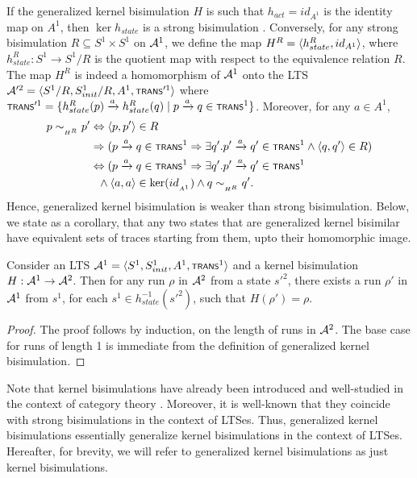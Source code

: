 If the generalized kernel bisimulation $H$ is such that $h_{act} = id_{A^1}$ is the identity map on $A^1$, then $\ker{h_{state}}$ is a strong bisimulation \cite[Appendix B]{tech-rpt}. Conversely, for any strong bisimulation  $R \subseteq S^1 \times S^1$ on $\cal A^1$, we define the map $H^{R} = \tup{h_{state}^{R},id_{A^1}}$, where $h_{state}^{R} : S^1 \rightarrow S^1/R$ is the quotient map with respect to the equivalence relation $R$. The map $H^R$ is indeed a homomorphism of $\cal A^1$ onto the LTS $\cal A'^2 = \tup{S^1/R,S_{init}^1/R,A^1,\trans'^1}$ where $\trans'^1 = \{ h_{state}^{R}(p) \xrightarrow{a} h_{state}^{R}(q) \mid p \xrightarrow{a} q \in \trans^1 \}$. Moreover, for any $a \in A^1$,
\begin{align*}
	p\sim\subsub{H^R} p' & \Leftrightarrow \tup{p,p'} \in R\\
	& \Rightarrow (p \xrightarrow{a} q \in \trans^1 \Rightarrow \exists q'. p' \xrightarrow{a} q' \in \trans^1 \wedge \tup{q,q'}\in R)\\
	& \Leftrightarrow (p \xrightarrow{a} q \in \trans^1 \Rightarrow \exists q'. p' \xrightarrow{a} q' \in \trans^1\\
	&  \,\,\,\,\wedge \tup{a,a}\in \ker{id\subsub{A^1}} \wedge q\sim\subsub{H^R}q'.
\end{align*}
Hence, generalized kernel bisimulation is weaker than strong bisimulation. Below, we state as a corollary, that any two states that are generalized kernel bisimilar have equivalent sets of traces starting from them, upto their homomorphic image.

\begin{lemma}\label{lem:bisim}
	Consider an LTS $\cal A^1 = \tup{S^1,S^1_{init},A^1,\trans^1}$ and a kernel bisimulation $H : \cal A^1 \rightarrow \cal A^2$. Then for any run $\rho$ in $\cal A^2$ from a state $s'^2$, there exists a run $\rho'$ in $\cal A^1$ from $s^1$, for each $s^1 \in h_{state}^{-1}(s'^2)$, such that $H(\rho') = \rho$.
\end{lemma}
\begin{proof}
	The proof follows by induction, on the length of runs in $\cal A^2$. The base case for runs of length 1 is immediate from the definition of generalized kernel bisimulation.
\end{proof}

Note that kernel bisimulations have already been introduced and well-studied in the context of category theory \cite{goncharov2014coalgebraic,staton2011relating}. Moreover, it is well-known that they coincide with strong bisimulations in the context of LTSes. Thus, generalized kernel bisimulations essentially generalize kernel bisimulations in the context of LTSes. Hereafter, for brevity, we will refer to generalized kernel bisimulations as just kernel bisimulations.

